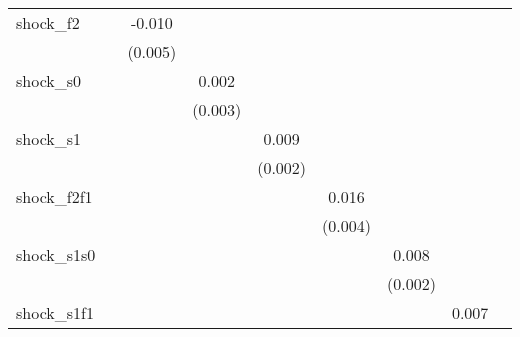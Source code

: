 {\begin{tabular}{l*{8}{c}}
\addlinespace
shock\_f2    &                     &      -0.010\sym{**} &                     &                     &                     &                     &                     &                     \\
            &                     &     (0.005)         &                     &                     &                     &                     &                     &                     \\
\addlinespace
shock\_s0    &                     &                     &       0.002         &                     &                     &                     &                     &                     \\
            &                     &                     &     (0.003)         &                     &                     &                     &                     &                     \\
\addlinespace
shock\_s1    &                     &                     &                     &       0.009\sym{***}&                     &                     &                     &                     \\
            &                     &                     &                     &     (0.002)         &                     &                     &                     &                     \\
\addlinespace
shock\_f2f1  &                     &                     &                     &                     &       0.016\sym{***}&                     &                     &                     \\
            &                     &                     &                     &                     &     (0.004)         &                     &                     &                     \\
\addlinespace
shock\_s1s0  &                     &                     &                     &                     &                     &       0.008\sym{***}&                     &                     \\
            &                     &                     &                     &                     &                     &     (0.002)         &                     &                     \\
\addlinespace
shock\_s1f1  &                     &                     &                     &                     &                     &                     &       0.007         &                     \\

\end{tabular}}
